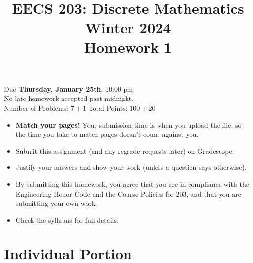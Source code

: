 \documentclass[12pt]{exam}
\newcommand{\hwnum}{1}
\begin{document}
\title{EECS 203: Discrete Mathematics\\
Winter 2024\\
Homework \hwnum{}}
\date{}
\author{}
\maketitle
\vspace{-50pt}
\begin{center}
\huge Due \textbf{Thursday, January 25th}, 10:00 pm\\
\Large No late homework accepted past midnight.\\
\vspace{10pt}
\large Number of Problems: $7+1$
\hspace{3cm}
Total Points: $100+20$
\end{center}
\vspace{25pt}
\begin{itemize}
\item \textbf{Match your pages!} Your submission time is when you upload the
file, so the time you take to match pages doesn't count against you.
\item Submit this assignment (and any regrade requests later) on Gradescope.
\item Justify your answers and show your work (unless a question says
otherwise).
\item By submitting this homework, you agree that you are in compliance with
the Engineering Honor Code and the Course Policies for 203, and that you are
submitting your own work.
\item Check the syllabus for full details.
\end{itemize}
\newpage
\section*{Individual Portion}
\end{document}
